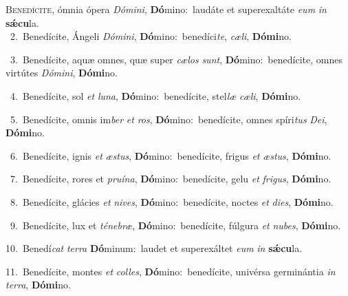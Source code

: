 \lettrine{\initial\textcolor{\initialcolor}{B}}{enedícite,} ómnia ópera \textit{Dó}\-\textit{mi}\textit{ni}, \textbf{Dó}\-mino:~\star laudáte et superexaltáte \textit{e}\-\textit{um} \textit{in} \textbf{sǽ}\-\textbf{cu}la.\\
{\numbfont\textcolor{\numbcolor}{~2.}}~Benedícite, Ángeli \textit{Dó}\-\textit{mi}\textit{ni}, \textbf{Dó}\-mino:~\star benedíci\-\textit{te}\-, \textit{cæ}\-\textit{li}, \textbf{Dó}\-\textbf{mi}no.\par
{\numbfont\textcolor{\numbcolor}{~3.}}~Benedícite, aquæ omnes, quæ super \textit{cæ}\-\textit{los} \textit{sunt}\-, \textbf{Dó}\-mino:~\star benedícite, omnes virtútes \textit{Dó}\-\textit{mi}\textit{ni}, \textbf{Dó}\-\textbf{mi}no.\par
{\numbfont\textcolor{\numbcolor}{~4.}}~Benedícite, sol \textit{et} \textit{lu}\-\textit{na}, \textbf{Dó}\-mino:~\star benedícite, stel\textit{læ} \textit{cæ}\-\textit{li}, \textbf{Dó}\-\textbf{mi}no.\par
{\numbfont\textcolor{\numbcolor}{~5.}}~Benedícite, omnis im\textit{ber} \textit{et} \textit{ros}\-, \textbf{Dó}\-mino:~\star benedícite, omnes spíri\textit{tus} \textit{De}\-\textit{i}, \textbf{Dó}\-\textbf{mi}no.\par
{\numbfont\textcolor{\numbcolor}{~6.}}~Benedícite, ignis \textit{et} \textit{æs}\-\textit{tus}, \textbf{Dó}\-mino:~\star benedícite, frigus \textit{et} \textit{æs}\-\textit{tus}, \textbf{Dó}\-\textbf{mi}no.\par
{\numbfont\textcolor{\numbcolor}{~7.}}~Benedícite, rores et \textit{pru}\-\textit{í}\textit{na}, \textbf{Dó}\-mino:~\star benedícite, gelu \textit{et} \textit{fri}\-\textit{gus}, \textbf{Dó}\-\textbf{mi}no.\par
{\numbfont\textcolor{\numbcolor}{~8.}}~Benedícite, glácies \textit{et} \textit{ni}\-\textit{ves}, \textbf{Dó}\-mino:~\star benedícite, noctes \textit{et} \textit{di}\-\textit{es}, \textbf{Dó}\-\textbf{mi}no.\par
{\numbfont\textcolor{\numbcolor}{~9.}}~Benedícite, lux et \textit{té}\-\textit{ne}\textit{bræ}, \textbf{Dó}\-mino:~\star benedícite, fúlgura \textit{et} \textit{nu}\-\textit{bes}, \textbf{Dó}\-\textbf{mi}no.\par
{\numbfont\textcolor{\numbcolor}{10.}}~Benedí\textit{cat} \textit{ter}\-\textit{ra} \textbf{Dó}\-minum:~\star laudet et superexáltet \textit{e}\-\textit{um} \textit{in} \textbf{sǽ}\-\textbf{cu}la.\par
{\numbfont\textcolor{\numbcolor}{11.}}~Benedícite, montes \textit{et} \textit{col}\-\textit{les}, \textbf{Dó}\-mino:~\star benedícite, univérsa germinántia \textit{in} \textit{ter}\-\textit{ra}, \textbf{Dó}\-\textbf{mi}no.\par
